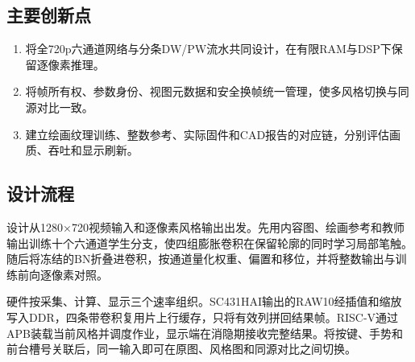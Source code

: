 \subsection{主要创新点}
\begin{enumerate}
\item 将全720p六通道网络与分条DW/PW流水共同设计，在有限RAM与DSP下保留逐像素推理。
\item 将帧所有权、参数身份、视图元数据和安全换帧统一管理，使多风格切换与同源对比一致。
\item 建立绘画纹理训练、整数参考、实际固件和CAD报告的对应链，分别评估画质、吞吐和显示刷新。
\end{enumerate}

\subsection{设计流程}
设计从1280×720视频输入和逐像素风格输出出发。先用内容图、绘画参考和教师输出训练十个六通道学生分支，使四组膨胀卷积在保留轮廓的同时学习局部笔触。随后将冻结的BN折叠进卷积，按通道量化权重、偏置和移位，并将整数输出与训练前向逐像素对照。

硬件按采集、计算、显示三个速率组织。SC431HAI输出的RAW10经插值和缩放写入DDR，四条带卷积复用片上行缓存，只将有效列拼回结果帧。RISC-V通过APB装载当前风格并调度作业，显示端在消隐期接收完整结果。将按键、手势和前台槽号关联后，同一输入即可在原图、风格图和同源对比之间切换。
